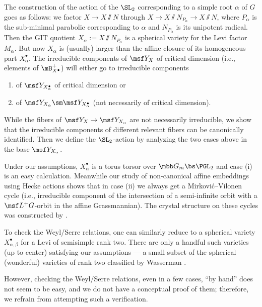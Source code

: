 \documentclass[final]{amsart}
\theoremstyle{remark}
\theoremstyle{definition}
\numberwithin{equation}{section}
\begin{document}
\smallskip

The construction of the action of the $\SL_2$ corresponding to a simple root $\alpha$ of $G$ 
goes as follows: 
we factor $X \to X \sslash N$ through $X \to X\sslash N_{P_\alpha} \to X\sslash N$, where $P_\alpha$ is the 
sub-minimal parabolic corresponding to $\alpha$ and $N_{P_\alpha}$ is its unipotent radical. 
Then the GIT quotient $X_\alpha:= X\sslash N_{P_\alpha}$ is a spherical variety for the Levi factor $M_\alpha$. 
But now $X_\alpha$ is (usually) larger than the affine closure of its homogeneous part $X_\alpha^\bullet$. 
The irreducible components of $\msf Y_X$ of critical dimension (i.e., elements of $\mB_{X^\bullet}^+$) 
will either go to irreducible components 
\begin{enumerate}
\item of $\msf Y_{X_\alpha^\bullet}$ of critical dimension or 
\item of $\msf Y_{X_\alpha} \sm \msf Y_{X_\alpha^\bullet}$ (not necessarily of critical dimension). 
\end{enumerate}
While the fibers of $\msf Y_X \to \msf Y_{X_\alpha}$ are not necessarily irreducible, we
show that the irreducible components of different relevant fibers can be canonically identified. 
Then we define the $\SL_2$-action by analyzing the two cases above in the base $\msf Y_{X_\alpha}$. 

Under our assumptions, $X_\alpha^\bullet$ is a torus torsor over $\mbb G_m \bs \PGL_2$ and case (i) is an easy
calculation. Meanwhile our study of non-canonical affine embeddings using Hecke actions 
shows that in case (ii) we always get a Mirkovi\'c--Vilonen cycle (i.e., irreducible
component of the intersection of a semi-infinite orbit with a $\msf L^+G$-orbit in the affine Grassmannian). 
The crystal structure on these cycles was constructed by \cite{BGcrys}. 



To check the Weyl/Serre relations, one can similarly reduce to a spherical variety $X^\bullet_{\alpha,\beta}$ for a Levi of semisimple rank two. There are only a handful such varieties (up to center) satisfying our assumptions --- a small subset of the spherical (wonderful) varieties of rank two classified by Wasserman \cite{Wasserman}.  


However, checking the Weyl/Serre relations, even in a few cases, ``by hand'' does not seem to be easy, and we do not have a conceptual proof of them; therefore, we refrain from attempting such a verification. 
\end{document}
